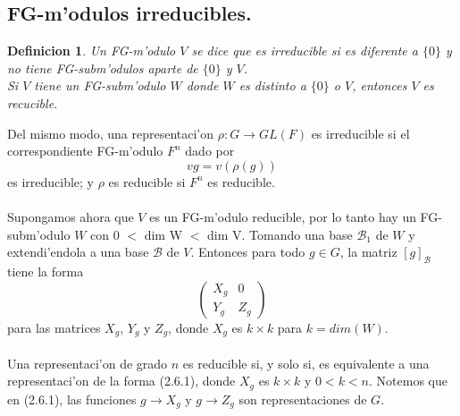 \documentclass[a4paper,openright,12pt]{book}
\numberwithin{equation}{section} %
\newtheorem{definicion}{Definicion}[section] %
\begin{document}
\subsection{FG-m'odulos irreducibles.}
\begin{definicion}
Un FG-m'odulo $V$ se dice que es irreducible si es diferente a $\{0\}$ y no tiene FG-subm'odulos aparte de $\{0\}$ y $V$.\\
Si $V$ tiene un FG-subm'odulo $W$ donde $W$ es distinto a $\{0\}$ o $V$, entonces $V$ es recucible.
\end{definicion}
Del mismo modo, una representaci'on $\rho : G \rightarrow GL(F)$ es irreducible si el correspondiente FG-m'odulo $F^{n}$ dado por
\[
vg=v(\rho (g))
\]
es irreducible; y $\rho$ es reducible si $F^{n}$ es reducible.\\
\\
Supongamos ahora que $V$ es un FG-m'odulo reducible, por lo tanto hay un FG-subm'odulo $W$ con 0 $<$ dim W $<$ dim V. Tomando una base $\mathscr{B_{1}}$ de $W$ y extendi'endola a una base $\mathscr{B}$ de $V$. Entonces para todo $g \in G$, la matriz $[g]_{\mathscr{B}}$ tiene la forma
\begin{equation}
\left( \begin{array}{c|c}
  X_{g} & 0 \\ 
  \hline
  Y_{g} & Z_{g}
 \end{array} \right)
\end{equation}
para las matrices $X_{g}$, $Y_{g}$ y $Z_{g}$, donde $X_{g}$ es $k \times k$ para $k=dim(W)$.\\
\\
Una representaci'on de grado $n$ es reducible si, y solo si, es equivalente a una representaci'on de la forma (2.6.1), donde $X_{g}$ es $k \times k$ y $0 < k < n$. Notemos que en (2.6.1), las funciones $g \rightarrow X_{g}$ y $g \rightarrow Z_{g}$ son representaciones de $G$.
\end{document}
